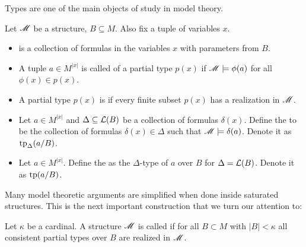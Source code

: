 Types are one of the main objects of study in model theory.
\begin{Definition}
  Let $\mathscr M$ be a structure, $B \subseteq M$.
  Also fix a tuple of variables $x$.
  \begin{itemize}
  \item {} is a collection of formulas in the variables $x$ with parameters from $B$.
  \item A tuple $a \in M^{|x|}$ is called  of a partial type $p(x)$ if
    $\mathscr M \models \phi(a)$ for all $\phi(x) \in p(x)$.
  \item A partial type $p(x)$ is  if every finite subset $p(x)$ has a realization in $\mathscr M$.
  \item Let $a \in M^{|x|}$ and $\Delta \subseteq \mathcal L(B)$ be a collection of formulas $\delta(x)$.
    Define the  to be the collection of formulas $\delta(x) \in \Delta$
    such that $\mathscr M \models \delta(a)$.
    Denote it as $\operatorname{tp}_{\Delta}(a/B)$.
  \item Let $a \in M^{|x|}$.
    Define the  as the $\Delta$-type of $a$ over $B$ for $\Delta = \mathcal L(B)$.
    Denote it as $\operatorname{tp}(a/B)$.
  \end{itemize}
\end{Definition}

Many model theoretic arguments are simplified when done inside saturated structures.
This is the next important construction that we turn our attention to:
\begin{Definition}
  Let $\kappa$ be a cardinal.
  A structure $\mathscr M$ is called  if for all $B \subset M$ with $|B| < \kappa$
  all consistent partial types over $B$ are realized in $\mathscr M$.
\end{Definition}

